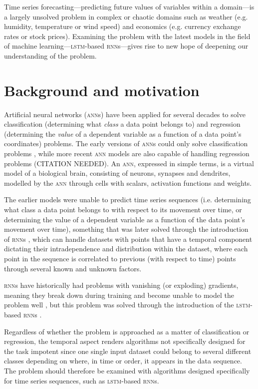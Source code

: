 Time series forecasting---predicting future values of variables within a
domain---is a largely unsolved problem in complex or chaotic domains such as
weather (e.g. humidity, temperature or wind speed) and economics (e.g. currency
exchange rates or stock prices).  Examining the problem with the latest models
in the field of machine learning---\textsc{lstm}-based \textsc{rnn}s---gives
rise to new hope of deepening our understanding of the problem.

\section{Background and motivation}
Artificial neural networks (\textsc{ann}s) have been applied for several decades
to solve classification (determining what \textit{class} a data point belongs
to) and regression (determining the \textit{value} of a dependent variable as a
function of a data point's coordinates) problems.  The early versions of
\textsc{ann}s could only solve classification problems \citep{rosenblatt1958},
while more recent \textsc{ann} models are also capable of handling regression
problems (CITATION NEEDED).  An \textsc{ann}, expressed in simple terms, is a
virtual model of a biological brain, consisting of neurons, synapses and
dendrites, modelled by the \textsc{ann} through cells with scalars, activation
functions and weights.

The earlier models were unable to predict time series sequences (i.e.
determining what class a data point belongs to with respect to its movement over
time, or determining the value of a dependent variable as a function of the data
point's movement over time), something that was later solved through the
introduction of \textsc{rnn}s \citep*{rumelhart1986}, which can handle datasets with
points that have a temporal component dictating their intradependence and
distribution within the dataset, where each point in the sequence is correlated
to previous (with respect to time) points through several known and unknown
factors.

\textsc{rnn}s have historically had problems with vanishing (or exploding)
gradients, meaning they break down during training and become unable to model
the problem well \citep{pascanu2012}, but this problem was solved through the
introduction of the \textsc{lstm}-based \textsc{rnn}s \citep*{hochreiter1997}.

Regardless of whether the problem is approached as a matter of classification or
regression, the temporal aspect renders algorithms not specifically designed for
the task impotent since one single input dataset could belong to several
different classes depending on where, in time or order, it appears in the data
sequence.  The problem should therefore be examined with algorithms designed
specifically for time series sequences, such as \textsc{lstm}-based
\textsc{rnn}s.


